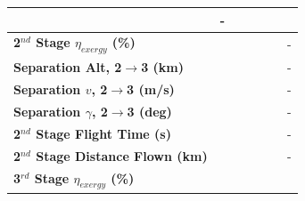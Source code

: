 \begin{table}[ht]
\begin{tabular}{l c c c c c c}
			& -
			\\
			\hline 
			\textbf{2$^{nd}$ Stage $\eta_{exergy}$ (\%)}
			& \textbf{\secondExergyEffCdThreeNinetyNoReturn}
			& \textbf{\secondExergyEffCdThreeNinetyFiveNoReturn}
			& \textbf{\secondExergyEffCdThreeStandardNoReturn}
			& \textbf{\secondExergyEffCdThreeOneOneHundredFiveNoReturn}
			& \textbf{\secondExergyEffCdThreeOneHundredTenNoReturn}
			& -
			\\
			\textbf{Separation Alt, 2$\rightarrow$3 (km)}
			& \secondthirdSeparationAltCdThreeNinetyNoReturn
			& \secondthirdSeparationAltCdThreeNinetyFiveNoReturn
			& \secondthirdSeparationAltCdThreeStandardNoReturn
			& \secondthirdSeparationAltCdThreeOneOneHundredFiveNoReturn
			& \secondthirdSeparationAltCdThreeOneHundredTenNoReturn
			& -
			\\
			\textbf{Separation $v$, 2$\rightarrow$3 (m/s)}
			& \secondthirdSeparationvCdThreeNinetyNoReturn
			& \secondthirdSeparationvCdThreeNinetyFiveNoReturn
			& \secondthirdSeparationvCdThreeStandardNoReturn
			& \secondthirdSeparationvCdThreeOneOneHundredFiveNoReturn
			& \secondthirdSeparationvCdThreeOneHundredTenNoReturn
			& -
			\\
			\textbf{Separation $\gamma$, 2$\rightarrow$3 (deg)}
			& \secondthirdSeparationgammaCdThreeNinetyNoReturn
			& \secondthirdSeparationgammaCdThreeNinetyFiveNoReturn
			& \secondthirdSeparationgammaCdThreeStandardNoReturn
			& \secondthirdSeparationgammaCdThreeOneOneHundredFiveNoReturn
			& \secondthirdSeparationgammaCdThreeOneHundredTenNoReturn
			& -
			\\
			\textbf{2$^{nd}$ Stage Flight Time (s)}
			& \secondFlightTimeCdThreeNinetyNoReturn
			& \secondFlightTimeCdThreeNinetyFiveNoReturn
			& \secondFlightTimeCdThreeStandardNoReturn
			& \secondFlightTimeCdThreeOneOneHundredFiveNoReturn
			& \secondFlightTimeCdThreeOneHundredTenNoReturn
			& -
			\\
			\textbf{2$^{nd}$ Stage Distance Flown (km)}
			& \SecondDistCdThreeNinetyNoReturn
			& \SecondDistCdThreeNinetyFiveNoReturn
			& \SecondDistCdThreeStandardNoReturn
			& \SecondDistCdThreeOneOneHundredFiveNoReturn
			& \SecondDistCdThreeOneHundredTenNoReturn
			& -
			\\
			\hline 
			\textbf{3$^{rd}$ Stage $\eta_{exergy}$ (\%)}
			& \textbf{\thirddExergyEffCdThreeNinetyNoReturn}
			& \textbf{\thirddExergyEffCdThreeNinetyFiveNoReturn}
			& \textbf{\thirddExergyEffCdThreeStandardNoReturn}
			& \textbf{\thirddExergyEffCdThreeOneOneHundredFiveNoReturn}
			& \textbf{\thirddExergyEffCdThreeOneHundredTenNoReturn}

\end{tabular}
\end{table}
